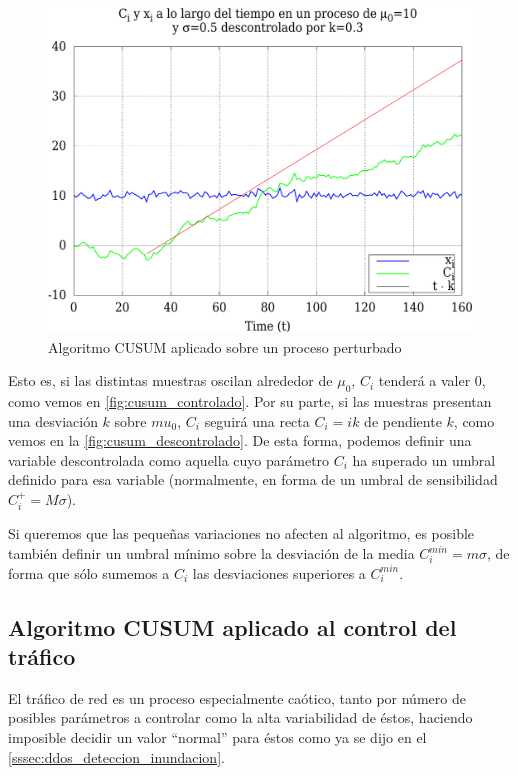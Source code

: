\begin{figure}[htbp]
\includegraphics[width=\columnwidth]{CapituloCusum/Figuras/cusumDescontrolado-crop}
\caption{Algoritmo CUSUM aplicado sobre un proceso perturbado}
\label{fig:cusum_descontrolado} 
\end{figure}

Esto es, si las distintas muestras oscilan alrededor de $\mu_0$, $C_i$ tenderá a valer 0,
como vemos en \autoref{fig:cusum_controlado}. Por su parte, si las muestras presentan 
una desviación $k$ sobre $mu_0$, $C_i$ seguirá una recta $C_i=ik$ de pendiente $k$, 
como vemos en la \autoref{fig:cusum_descontrolado}. De esta forma, podemos definir una
variable descontrolada como aquella cuyo parámetro
$C_i$ ha superado un umbral definido para esa variable (normalmente, en forma de un
umbral de sensibilidad $C_i^+=M\sigma$).

Si queremos que las pequeñas variaciones no afecten al algoritmo, es posible también
definir un umbral mínimo sobre la desviación de la media $C_i^{min}=m\sigma$, de 
forma que sólo sumemos a $C_i$ las desviaciones superiores a $C_i^{min}$.

\subsection{Algoritmo CUSUM aplicado al control del tráfico}
\label{ssec:cusum_aplicado_trafico}
El tráfico de red es un proceso especialmente caótico, tanto por número de posibles
parámetros a controlar como la alta variabilidad de éstos,
haciendo imposible decidir un valor ``normal'' para éstos como ya se dijo en el 
\autoref{sssec:ddos_deteccion_inundacion}.

